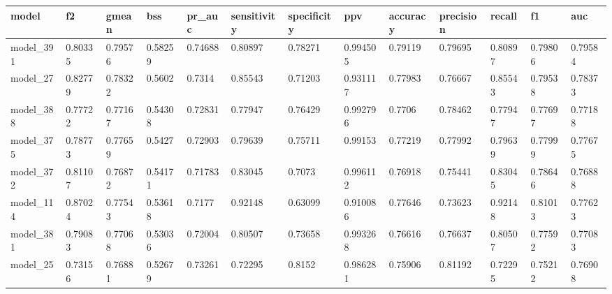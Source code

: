 \begin{tabular}{|l|l|l|l|l|l|l|l|l|l|l|l|l|}
\hline
\textbf{model} & \textbf{f2} & \textbf{gmean} & \textbf{bss} & \textbf{pr\_auc} & \textbf{sensitivity} & \textbf{specificity} & \textbf{ppv} & \textbf{accuracy} & \textbf{precision} & \textbf{recall} & \textbf{f1} & \textbf{auc} \\ \hline
model\_391     & 0.80335     & 0.79576        & 0.58259      & 0.74688          & 0.80897              & 0.78271              & 0.994505     & 0.79119           & 0.79695            & 0.80897         & 0.79806     & 0.79584      \\ \hline
model\_27      & 0.82779     & 0.78322        & 0.5602       & 0.7314           & 0.85543              & 0.71203              & 0.931117     & 0.77983           & 0.76667            & 0.85543         & 0.79538     & 0.78373      \\ \hline
model\_388     & 0.77722     & 0.77167        & 0.54308      & 0.72831          & 0.77947              & 0.76429              & 0.992796     & 0.7706            & 0.78462            & 0.77947         & 0.77697     & 0.77188      \\ \hline
model\_375     & 0.78773     & 0.77659        & 0.5427       & 0.72903          & 0.79639              & 0.75711              & 0.99153      & 0.77219           & 0.77992            & 0.79639         & 0.77999     & 0.77675      \\ \hline
model\_372     & 0.81107     & 0.76872        & 0.54171      & 0.71783          & 0.83045              & 0.7073               & 0.996112     & 0.76918           & 0.75441            & 0.83045         & 0.78646     & 0.76888      \\ \hline
model\_114     & 0.87024     & 0.77543        & 0.53618      & 0.7177           & 0.92148              & 0.63099              & 0.910086     & 0.77646           & 0.73623            & 0.92148         & 0.81013     & 0.77623      \\ \hline
model\_381     & 0.79083     & 0.77068        & 0.53036      & 0.72004          & 0.80507              & 0.73658              & 0.993268     & 0.76616           & 0.76637            & 0.80507         & 0.77592     & 0.77083      \\ \hline
model\_25      & 0.73156     & 0.76881        & 0.52679      & 0.73261          & 0.72295              & 0.8152               & 0.986281     & 0.75906           & 0.81192            & 0.72295         & 0.75212     & 0.76908      \\ \hline

\end{tabular}
